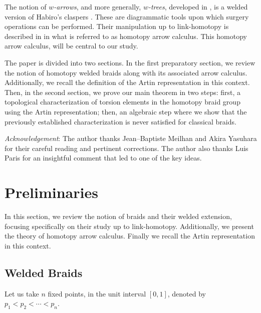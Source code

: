 \documentclass[11pt, a4paper, twoside,reqno]{amsart}
\theoremstyle{plain}
\theoremstyle{definition}
\theoremstyle{remark}
\begin{document}
The notion of \emph{$w$-arrows}, and more generally, \emph{$w$-trees}, developed in \cite{JBYasuArrowcalc}, is a welded version of Habiro's claspers \cite{HabiroClasp}. These are diagrammatic tools upon which surgery operations can be performed. Their manipulation up to link-homotopy is described in \cite[\S9]{JBYasuArrowcalc} in what is referred to as homotopy arrow calculus. This homotopy arrow calculus, will be central to our study.
\bigskip

The paper is divided into two sections. In the first preparatory section, we review the notion of homotopy welded braids along with its associated arrow calculus. Additionally, we recall the definition of the Artin representation in this context. Then, in the second section, we prove our main theorem in two steps: first, a topological characterization of torsion elements in the homotopy braid group using the Artin representation; then, an algebraic step where we show that the previously established characterization is never satisfied for classical braids.

\medskip\emph{Acknowledgement}: The author thanks Jean--Baptiste Meilhan and Akira Yasuhara for their careful reading and pertinent corrections. The author also thanks Luis Paris for an insightful comment that led to one of the key ideas.

\section{Preliminaries}
In this section, we review the notion of braids and their welded extension, focusing specifically on their study up to link-homotopy. Additionally, we present the theory of homotopy arrow calculus. Finally we recall the Artin representation in this context. 

\subsection{Welded Braids}\label{sectionwelded}

Let us take $n$ fixed points, in the unit interval $[0,1]$, denoted by $p_1<p_2<\cdots<p_n$.
\end{document}
